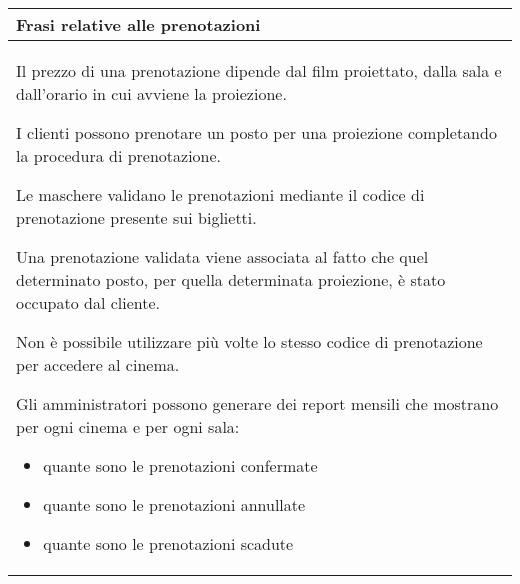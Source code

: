 \begin{tabularx}{\linewidth}{|X|}
    \hline
    \rowcolor{tblhdrcolor}
    \textbf{Frasi relative alle prenotazioni} \\\hline
    Il prezzo di una prenotazione dipende dal film proiettato,
    dalla sala e dall'orario in cui avviene la proiezione.

    I clienti possono prenotare un posto per una proiezione
    completando la procedura di prenotazione.

    Le maschere validano le prenotazioni mediante il codice
    di prenotazione presente sui biglietti.

    Una prenotazione validata viene associata al fatto che quel
    determinato posto, per quella determinata proiezione,
    è stato occupato dal cliente.

    Non è possibile utilizzare più volte lo stesso codice di
    prenotazione per accedere al cinema.

    Gli amministratori possono generare dei report mensili che
    mostrano per ogni cinema e per ogni sala:
    \begin{itemize}
        \item quante sono le prenotazioni confermate
        \item quante sono le prenotazioni annullate
        \item quante sono le prenotazioni scadute
    \end{itemize}
    \\ \hline
\end{tabularx}

